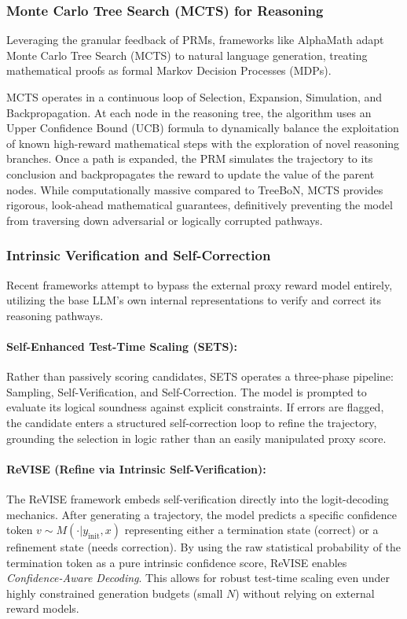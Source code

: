 \documentclass[a4paper,11pt]{article}
\begin{document}
\subsubsection{Monte Carlo Tree Search (MCTS) for Reasoning}
Leveraging the granular feedback of PRMs, frameworks like AlphaMath \cite{chen2024alphamath} adapt Monte Carlo Tree Search (MCTS) to natural language generation, treating mathematical proofs as formal Markov Decision Processes (MDPs). 

MCTS operates in a continuous loop of Selection, Expansion, Simulation, and Backpropagation. At each node in the reasoning tree, the algorithm uses an Upper Confidence Bound (UCB) formula to dynamically balance the exploitation of known high-reward mathematical steps with the exploration of novel reasoning branches. Once a path is expanded, the PRM simulates the trajectory to its conclusion and backpropagates the reward to update the value of the parent nodes. While computationally massive compared to TreeBoN, MCTS provides rigorous, look-ahead mathematical guarantees, definitively preventing the model from traversing down adversarial or logically corrupted pathways.

\subsubsection{Intrinsic Verification and Self-Correction}
Recent frameworks attempt to bypass the external proxy reward model entirely, utilizing the base LLM's own internal representations to verify and correct its reasoning pathways.

\paragraph{Self-Enhanced Test-Time Scaling (SETS):}Rather than passively scoring candidates, SETS \cite{chen2025sets} operates a three-phase pipeline: Sampling, Self-Verification, and Self-Correction. The model is prompted to evaluate its logical soundness against explicit constraints. If errors are flagged, the candidate enters a structured self-correction loop to refine the trajectory, grounding the selection in logic rather than an easily manipulated proxy score.\paragraph{ReVISE (Refine via Intrinsic Self-Verification):}The ReVISE framework \cite{lee2025revise} embeds self-verification directly into the logit-decoding mechanics. After generating a trajectory, the model predicts a specific confidence token $v \sim M(\cdot | y_{\text{init}}, x)$ representing either a termination state (correct) or a refinement state (needs correction). By using the raw statistical probability of the termination token as a pure intrinsic confidence score, ReVISE enables \textit{Confidence-Aware Decoding}. This allows for robust test-time scaling even under highly constrained generation budgets (small $N$) without relying on external reward models.
\end{document}
